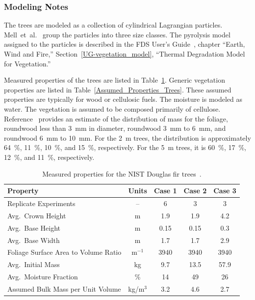 \subsubsection{Modeling Notes}

The trees are modeled as a collection of cylindrical Lagrangian particles. Mell~et~al.~\cite{Mell:2009} group the particles into three size classes. The pyrolysis model assigned to the particles is described in the FDS User's Guide~\cite{FDS_Users_Guide}, chapter ``Earth, Wind and Fire,'' Section~\ref{UG-vegetation_model}, ``Thermal Degradation Model for Vegetation.''

Measured properties of the trees are listed in Table~\ref{Properties_Trees}. Generic vegetation properties are listed in Table~\ref{Assumed_Properties_Trees}. These assumed properties are typically for wood or cellulosic fuels. The moisture is modeled as water. The vegetation is assumed to be composed primarily of cellulose. Reference~\cite{Mell:2009} provides an estimate of the distribution of mass for the foliage, roundwood less than 3~mm in diameter, roundwood 3~mm to 6~mm, and roundwood 6~mm to 10~mm. For the 2~m trees, the distribution is approximately 64~\%, 11~\%, 10~\%, and 15~\%, respectively. For the 5~m trees, it is 60~\%, 17~\%, 12~\%, and 11~\%, respectively.

\begin{table}[ht]
\begin{center}
\caption[Measured properties for the NIST Douglas fir trees]{Measured properties for the NIST Douglas fir trees~\cite{Mell:2009}.}
\label{Properties_Trees}
\begin{tabular}{|l|c|c|c|c|}
\hline
Property                                & Units         & Case 1        & Case 2        & Case 3     \\ \hline \hline
Replicate Experiments                   & --            & 6             & 3             & 3          \\ \hline
Avg.~Crown Height                       & m             & 1.9           & 1.9           & 4.2        \\ \hline
Avg.~Base Height                        & m             & 0.15          & 0.15          & 0.3        \\ \hline
Avg.~Base Width                         & m             & 1.7           & 1.7           & 2.9        \\ \hline
Foliage Surface Area to Volume Ratio    & m$^{-1}$      & 3940          & 3940          & 3940       \\ \hline
Avg.~Initial Mass                       & kg            & 9.7           & 13.5          & 57.9       \\ \hline
Avg.~Moisture Fraction                  & \%            & 14            & 49            & 26         \\ \hline
Assumed Bulk Mass per Unit Volume       & kg/m$^3$      & 3.2           & 4.6           & 2.7        \\ \hline
\end{tabular}
\end{center}
\end{table}

